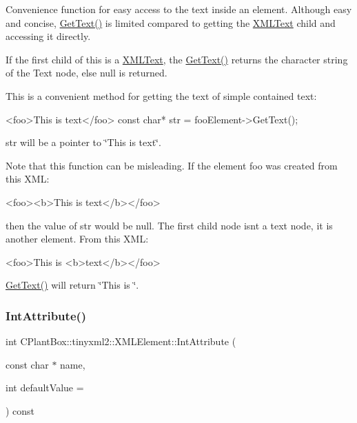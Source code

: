 Convenience function for easy access to the text inside an element. Although easy and concise, \hyperlink{classCPlantBox_1_1tinyxml2_1_1XMLElement_aa24b9d351b590707144522ec8a004270}{Get\+Text()} is limited compared to getting the \hyperlink{classCPlantBox_1_1tinyxml2_1_1XMLText}{X\+M\+L\+Text} child and accessing it directly.

If the first child of \textquotesingle{}this\textquotesingle{} is a \hyperlink{classCPlantBox_1_1tinyxml2_1_1XMLText}{X\+M\+L\+Text}, the \hyperlink{classCPlantBox_1_1tinyxml2_1_1XMLElement_aa24b9d351b590707144522ec8a004270}{Get\+Text()} returns the character string of the Text node, else null is returned.

This is a convenient method for getting the text of simple contained text\+: \begin{DoxyVerb}<foo>This is text</foo>
    const char* str = fooElement->GetText();
\end{DoxyVerb}


\textquotesingle{}str\textquotesingle{} will be a pointer to \char`\"{}\+This is text\char`\"{}.

Note that this function can be misleading. If the element foo was created from this X\+ML\+: \begin{DoxyVerb}    <foo><b>This is text</b></foo>
\end{DoxyVerb}


then the value of str would be null. The first child node isn\textquotesingle{}t a text node, it is another element. From this X\+ML\+: \begin{DoxyVerb}    <foo>This is <b>text</b></foo>
\end{DoxyVerb}
 \hyperlink{classCPlantBox_1_1tinyxml2_1_1XMLElement_aa24b9d351b590707144522ec8a004270}{Get\+Text()} will return \char`\"{}\+This is \char`\"{}. \mbox{\label{classCPlantBox_1_1tinyxml2_1_1XMLElement_ac0bb2fd733415649e95c36b08a7b700e}} 
\subsubsection{\texorpdfstring{Int\+Attribute()}{IntAttribute()}}
{\footnotesize\ttfamily int C\+Plant\+Box\+::tinyxml2\+::\+X\+M\+L\+Element\+::\+Int\+Attribute (\begin{DoxyParamCaption}\item[{const char $\ast$}]{name,  }\item[{int}]{default\+Value = {} }\end{DoxyParamCaption}) const}

